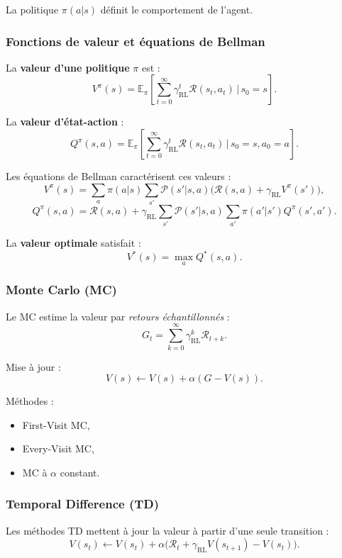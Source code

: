 \documentclass[11pt,a4paper]{article}
\newcommand{\1}{\mathbf{1}}
\begin{document}
La politique $\pi(a|s)$ définit le comportement de l'agent.

\subsubsection{Fonctions de valeur et équations de Bellman}

La \textbf{valeur d'une politique} $\pi$ est :
\[
V^\pi(s) =
\mathbb{E}_\pi\!\left[
 \sum_{t=0}^\infty \gamma_{\mathrm{RL}}^t \mathcal{R}(s_t,a_t)
 \,\bigg|\, s_0 = s
\right].
\]

La \textbf{valeur d'état-action} :
\[
Q^\pi(s,a)
=
\mathbb{E}_\pi\!\left[
 \sum_{t=0}^\infty \gamma_{\mathrm{RL}}^t \mathcal{R}(s_t,a_t)
 \,\bigg|\, s_0=s, a_0=a
\right].
\]

Les équations de Bellman caractérisent ces valeurs :
\[
V^\pi(s)
=
\sum_{a} \pi(a|s)
\sum_{s'} \mathcal{P}(s'|s,a)\bigl(
 \mathcal{R}(s,a) + \gamma_{\mathrm{RL}} V^\pi(s')
 \bigr),
\]
\[
Q^\pi(s,a)
=
 \mathcal{R}(s,a) + \gamma_{\mathrm{RL}}
\sum_{s'} \mathcal{P}(s'|s,a)
\sum_{a'} \pi(a'|s') Q^\pi(s',a').
\]

La \textbf{valeur optimale} satisfait :
\[
V^*(s) = \max_{a} Q^*(s,a).
\]

\subsubsection{Monte Carlo (MC)}

Le MC estime la valeur par \emph{retours échantillonnés} :
\[
G_t = \sum_{k=0}^\infty \gamma_{\mathrm{RL}}^k \mathcal{R}_{t+k}.
\]

Mise à jour :
\[
V(s) \leftarrow V(s) + \alpha (G - V(s)).
\]

Méthodes :
\begin{itemize}
  \item First-Visit MC,
  \item Every-Visit MC,
  \item MC à $\alpha$ constant.
\end{itemize}

\subsubsection{Temporal Difference (TD)}

Les méthodes TD mettent à jour la valeur à partir d'une seule transition :
\[
V(s_t) \leftarrow V(s_t)
+ \alpha \bigl( \mathcal{R}_t + \gamma_{\mathrm{RL}} V(s_{t+1}) - V(s_t) \bigr).
\]
\end{document}
